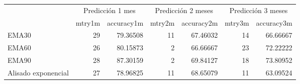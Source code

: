 \documentclass[]{article}
\newenvironment{Shaded}{\begin{snugshade}}{\end{snugshade}}
\newcommand{\KeywordTok}[1]{\textcolor[rgb]{0.13,0.29,0.53}{\textbf{#1}}}
\newcommand{\DataTypeTok}[1]{\textcolor[rgb]{0.13,0.29,0.53}{#1}}
\newcommand{\DecValTok}[1]{\textcolor[rgb]{0.00,0.00,0.81}{#1}}
\newcommand{\StringTok}[1]{\textcolor[rgb]{0.31,0.60,0.02}{#1}}
\newcommand{\OperatorTok}[1]{\textcolor[rgb]{0.81,0.36,0.00}{\textbf{#1}}}
\newcommand{\NormalTok}[1]{#1}
\begin{document}
\begin{Shaded}
\end{Shaded}

\begin{table}[H]
\centering\begingroup\fontsize{10}{12}\selectfont

\begin{tabular}{l|r|r|r|r|r|r}
\hline
\multicolumn{1}{c|}{ } & \multicolumn{2}{|c|}{Predicción 1 mes} & \multicolumn{2}{|c|}{Predicción 2 meses} & \multicolumn{2}{|c}{Predicción 3 meses} \\
\cline{2-3} \cline{4-5} \cline{6-7}
  & mtry1m & accuracy1m & mtry2m & accuracy2m & mtry3m & accuracy3m\\
\hline
EMA30 & 29 & 79.36508 & 11 & 67.46032 & 14 & 66.66667\\
\hline
EMA60 & 26 & 80.15873 & 2 & 66.66667 & 23 & 72.22222\\
\hline
EMA90 & 28 & 87.30159 & 2 & 69.84127 & 18 & 73.80952\\
\hline
Alisado exponencial & 27 & 78.96825 & 11 & 68.65079 & 11 & 63.09524\\
\hline
\end{tabular}\endgroup{}
\end{table}


\setlength\parskip{5ex}
\end{document}
